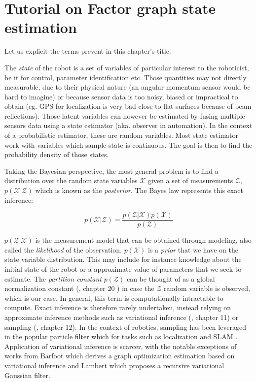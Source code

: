 \chapter{Tutorial on Factor graph state estimation}
\minitoc

Let us explicit the terms prevent in this chapter's title. 

The \textit{state} of the robot is a set of variables of particular interest to the roboticist, be it for control, parameter identification etc.
Those quantities may not directly measurable, due to their physical nature (an angular momentum sensor would be hard to imagine) or because sensor data
is too noisy, biased or impractical to obtain (eg. GPS for localization is very bad close to flat surfaces because of beam reflections). 
Those latent variables can however be estimated by fusing multiple sensors data using a state estimator (aka. observer in automation). In the context of 
a probabilistic estimator, these are random variables. Most state estimator work with variables which sample state is continuous. The goal is then 
to find the probability density of those states.

Taking the Bayesian perspective, the most general problem is to find a distribution over the random state variables $\mathcal{X}$ given a set 
of measurements $\mathcal{Z}$, $p(\mathcal{X} | \mathcal{Z})$ which is known as the \textit{posterior}. 
The Bayes law represents this exact inference:

\begin{equation}
    p(\mathcal{X} | \mathcal{Z}) = \frac{p(\mathcal{Z} | \mathcal{X}) p(\mathcal{X})}{p(\mathcal{Z})} 
\end{equation}

$p(\mathcal{Z} | \mathcal{X})$ is the measurement model that can be obtained through modeling, also called the \textit{likelihood} of the observation. 
$p(\mathcal{X})$ is a \textit{prior} that we have on the state variable distribution. This may include for instance knowledge about the initial state of the robot or
a approximate value of parameters that we seek to estimate.
The \textit{partition constant} $p(\mathcal{Z})$ can be thought of as a global normalization constant (\cite{koller2009probabilistic}, chapter 20 ) in case 
the $\mathcal{Z}$ random variable is observed, which is our case. In general, this term is computationally intractable to compute. Exact inference is 
therefore rarely undertaken, instead relying on approximate inference methods such as variational inference (\cite{koller2009probabilistic}, chapter 11) 
or sampling (\cite{koller2009probabilistic}, chapter 12). In the context of robotics, sampling has been leveraged in the popular particle filter which for 
tasks such as localization \cite{dellaert1999monte} and SLAM \cite{montemerlo2002fastslam}. Application of variational inference is scarcer, with the notable 
exceptions of works from Barfoot \cite{barfoot2020exactly, wong2020variational} which derives a graph optimization estimation based on variational inference
and Lambert \cite{lambert2022recursive} which proposes a recursive variational Gaussian filter.

